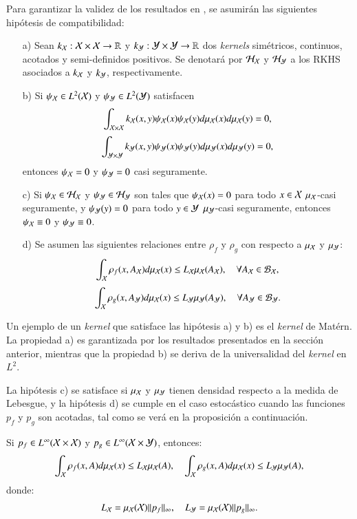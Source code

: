 Para garantizar la validez de los resultados en \cite{Philipp2024ErrorOperator}, se asumirán las siguientes hipótesis de compatibilidad:
\begin{enumerate}
    \item[a)] Sean $k_{\mathcal{X}}:\mathcal{X} \times \mathcal{X} \to \mathbb{R}$ y $k_{\mathcal{Y}}: \mathcal{Y} \times \mathcal{Y} \to \mathbb{R}$ dos \textit{kernels} simétricos, continuos, acotados y semi-definidos positivos. Se denotará por $\mathcal{H}_{\mathcal{X}}$ y $\mathcal{H}_{\mathcal{Y}}$ a los RKHS asociados a $k_{\mathcal{X}}$ y $k_{\mathcal{Y}}$, respectivamente.
    
    \item[b)] Si $\psi_{\mathcal{X}} \in L^2(\mathcal{X})$ y $\psi_{\mathcal{Y}} \in L^2(\mathcal{Y})$ satisfacen  
    \[
        \int_{\mathcal{X} \times \mathcal{X}} k_{\mathcal{X}}(x,y) \psi_{\mathcal{X}} (x) \psi_{\mathcal{X}} (y) d \mu_{\mathcal{X}} (x) d \mu_{\mathcal{X}} (y) = 0, 
    \]
    \[
        \int_{\mathcal{Y} \times \mathcal{Y}} k_{\mathcal{Y}}(x,y) \psi_{\mathcal{Y}} (x) \psi_{\mathcal{Y}} (y) d \mu_{\mathcal{Y}} (x) d \mu_{\mathcal{Y}} (y) = 0, 
    \]
    entonces $\psi_{\mathcal{X}} = 0$ y $\psi_{\mathcal{Y}} = 0$ casi seguramente.
    
    \item[c)] Si $\psi_{\mathcal{X}} \in \mathcal{H}_{\mathcal{X}}$ y $\psi_{\mathcal{Y}} \in \mathcal{H}_{\mathcal{Y}}$ son tales que $\psi_{\mathcal{X}}(x) = 0$ para todo $x \in \mathcal{X}$ $\mu_{\mathcal{X}}$-casi seguramente, y $\psi_{\mathcal{Y}}(y) = 0$ para todo $y \in \mathcal{Y}$ $\mu_{\mathcal{Y}}$-casi seguramente, entonces $\psi_{\mathcal{X}} \equiv 0$ y $\psi_{\mathcal{Y}} \equiv 0$.
    
    \item[d)] Se asumen las siguientes relaciones entre $\rho_f$ y $\rho_g$ con respecto a $\mu_{\mathcal{X}}$ y $\mu_{\mathcal{Y}}$:
    \[
        \int_{\mathcal{X}} \rho_f (x, A_{\mathcal{X}}) d\mu_{\mathcal{X}} (x) \leq L_{\mathcal{X}} \mu_{\mathcal{X}} (A_{\mathcal{X}}), \quad \forall A_{\mathcal{X}} \in \mathcal{B}_{\mathcal{X}},
    \]
    \[
        \int_{\mathcal{X}} \rho_g (x, A_{\mathcal{Y}}) d\mu_{\mathcal{X}} (x) \leq L_{\mathcal{Y}} \mu_{\mathcal{Y}} (A_{\mathcal{Y}}), \quad \forall A_{\mathcal{Y}} \in \mathcal{B}_{\mathcal{Y}}.
    \]
\end{enumerate}

Un ejemplo de un \textit{kernel} que satisface las hipótesis a) y b) es el \textit{kernel} de Matérn. La propiedad a) es garantizada por los resultados presentados en la sección anterior, mientras que la propiedad b) se deriva de la universalidad del \textit{kernel} en $L^2$. 

La hipótesis c) se satisface si $\mu_{\mathcal{X}}$ y $\mu_{\mathcal{Y}}$ tienen densidad respecto a la medida de Lebesgue, y la hipótesis d) se cumple en el caso estocástico cuando las funciones $p_f$ y $p_g$ son acotadas, tal como se verá en la proposición a continuación.

\begin{prop}
    Si $p_f \in L^{\infty} (\mathcal{X} \times \mathcal{X})$ y $p_g \in L^{\infty} (\mathcal{X} \times \mathcal{Y})$, entonces:
    \[
        \int_{\mathcal{X}} \rho_f (x, A) d\mu_{\mathcal{X}} (x) \leq L_{\mathcal{X}} \mu_{\mathcal{X}} (A), \quad \int_{\mathcal{X}} \rho_g (x, A) d\mu_{\mathcal{X}} (x) \leq L_{\mathcal{Y}} \mu_{\mathcal{Y}} (A),
    \]
    donde:
    \[
        L_{\mathcal{X}} = \mu_{\mathcal{X}} (\mathcal{X}) \| p_f \|_\infty, \quad L_{\mathcal{Y}} = \mu_{\mathcal{X}} (\mathcal{X}) \| p_g \|_\infty.
    \]
\end{prop}

